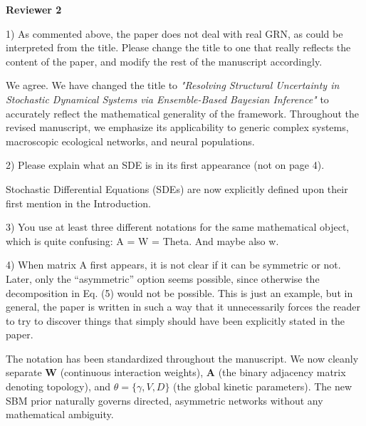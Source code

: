 \documentclass[11pt,a4paper]{article}
\newcommand{\reviewer}[1]{\vspace{1.5em}\noindent\textbf{\Large #1}\vspace{0.5em}}
\begin{document}
\vspace{1em}
\hrulefill

\reviewer{Reviewer 2}

\begin{reviewercomment}
1) As commented above, the paper does not deal with real GRN, as could be interpreted from the title. Please change the title to one that really reflects the content of the paper, and modify the rest of the manuscript accordingly.
\end{reviewercomment}

We agree. We have changed the title to \textit{"Resolving Structural Uncertainty in Stochastic Dynamical Systems via Ensemble-Based Bayesian Inference"} to accurately reflect the mathematical generality of the framework. Throughout the revised manuscript, we emphasize its applicability to generic complex systems, macroscopic ecological networks, and neural populations.

\begin{reviewercomment}
2) Please explain what an SDE is in its first appearance (not on page 4).
\end{reviewercomment}

Stochastic Differential Equations (SDEs) are now explicitly defined upon their first mention in the Introduction.

\begin{reviewercomment}
3) You use at least three different notations for the same mathematical object, which is quite confusing: A = W = Theta. And maybe also w.

4) When matrix A first appears, it is not clear if it can be symmetric or not. Later, only the “asymmetric” option seems possible, since otherwise the decomposition in Eq. (5) would not be possible. This is just an example, but in general, the paper is written in such a way that it unnecessarily forces the reader to try to discover things that simply should have been explicitly stated in the paper.
\end{reviewercomment}

The notation has been standardized throughout the manuscript. We now cleanly separate $\mathbf{W}$ (continuous interaction weights), $\mathbf{A}$ (the binary adjacency matrix denoting topology), and $\theta = \{\gamma, V, D\}$ (the global kinetic parameters). The new SBM prior naturally governs directed, asymmetric networks without any mathematical ambiguity.
\end{document}
